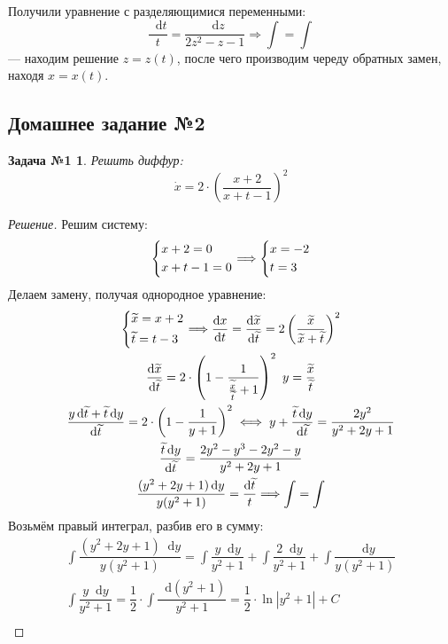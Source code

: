 \documentclass[a4paper,12pt]{article}
\newtheorem*{task1}{Задача №1}
\renewcommand*\d{\mathop{}\!\mathrm{d}}
\newcommand{\dx}{\dot{x}}
\newcommand{\wx}{\widetilde{x}}
\newcommand{\wt}{\widetilde{t}}
\newcommand{\ds}{\displaystyle}
\begin{document}
Получили уравнение с разделяющимися переменными:
\[\dfrac{\d t}{t} = \dfrac{\d z}{2z^2 - z - 1} \Longrightarrow \ds\int = \int\] --- находим решение $z = z(t)$, после чего производим череду обратных замен, находя $x = x(t)$.

\subsection{Домашнее задание №2}


\begin{task1}
	Решить диффур:
	\[\dx = 2 \cdot \left(\dfrac{x + 2}{x + t - 1}\right)^2\]
\end{task1}
\begin{proof}[Решение]
	Решим систему:
	\[\left\{\begin{gathered}
	x + 2 = 0\hfill\\
	x + t - 1 = 0\hfill
	\end{gathered}\right. \Longrightarrow \left\{\begin{gathered}
	x = -2\hfill\\
	t = 3\hfill
	\end{gathered}\right.\]
	Делаем замену, получая однородное уравнение:
	\begin{gather*}\left\{\begin{gathered}
	\wx = x + 2\hfill\\
	\wt = t - 3\hfill
	\end{gathered}\right. \Longrightarrow \dfrac{\d x}{\d t} = \dfrac{\d \wx}{\d\wt} = 2\left(\dfrac{\wx}{\wx + \wt}\right)^2\\
	\dfrac{\d\wx}{\d\wt} = 2 \cdot \left(1 - \dfrac{1}{\frac{\wx}{\wt} + 1}\right)^2\ y = \dfrac{\wx}{\wt}\\
	\dfrac{y\d \wt + \wt\d y}{\d \wt} = 2\cdot\left(1 - \dfrac{1}{y + 1}\right)^2 \iff y + \dfrac{\wt\d y}{\d\wt} = \dfrac{2y^2}{y^2 + 2y + 1}\\
	\dfrac{\wt\d y}{\d\wt} = \dfrac{2y^2 - y^3 - 2y^2 - y}{y^2 + 2y + 1}\\
	\dfrac{(y^2 + 2y + 1)\d y}{y(y^2 + 1)} = \dfrac{\d\wt}{t} \Longrightarrow \ds\int = \int
	\end{gather*}
	Возьмём правый интеграл, разбив его в сумму:
	\begin{gather*}
		\ds\int\dfrac{(y^2 + 2y + 1)\d y}{y(y^2 + 1)} = \ds\int \dfrac{y\d y}{y^2 + 1} + \ds\int\dfrac{2\d y}{y^2 + 1} + \ds\int \dfrac{\d y}{y(y^2 + 1)}\\
		\ds\int\dfrac{y\d y}{y^2 + 1} = \dfrac{1}{2}\cdot\ds\int\dfrac{\d(y^2 + 1)}{y^2 + 1} = \dfrac{1}{2}\cdot \ln|y^2 + 1| + C\\

\end{gather*}
\end{proof}
\end{document}
